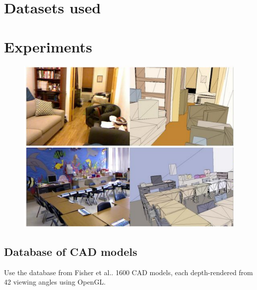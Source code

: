 \documentclass[10pt,twocolumn,letterpaper]{article}
\makeatletter
\newcommand*{\ea}{et al.\@\xspace}
\makeatother
\begin{document}
\section{Datasets used}


\section{Experiments}


\begin{figure}
    \centering%
    \includegraphics[width=1.0\columnwidth]{guo.png}%
    \label{fig:guo_labels}%
\end{figure}



\subsection{Database of CAD models}
Use the database from Fisher \ea \cite{fisher-siggraphasia-2012}.
1600 CAD models, each depth-rendered from 42 viewing angles using OpenGL.
\end{document}
